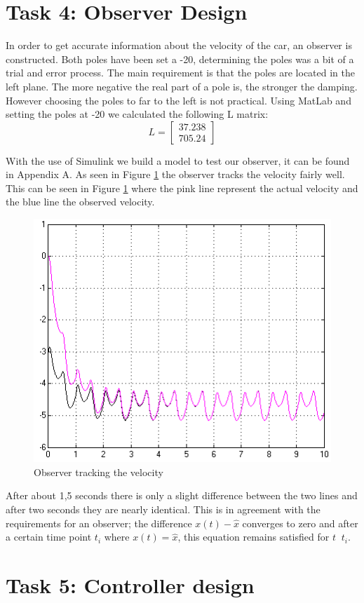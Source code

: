 \documentclass[final]{scrreprt} %
\begin{document}
\section*{Task 4: Observer Design}
In order to get accurate information about the velocity of the car, an observer is constructed. Both poles have been set a -20, determining the poles was a bit of a trial and error process. The main requirement is that the poles are located in the left plane. The more negative the real part of a pole is, the stronger the damping. However choosing the poles to far to the left is not practical. Using MatLab and setting the poles at -20 we calculated the following L matrix:
\begin{equation}
L=
\begin{bmatrix}
  37.238 \\
  705.24
 \end{bmatrix}
\end{equation}

With the use of Simulink we build a model to test our observer, it can be found in Appendix A.
As seen in Figure \ref{fig:observer} the observer tracks the velocity fairly well. This can be seen in Figure \ref{fig:observer} where the pink line represent the actual velocity and the blue line the observed velocity. 

\begin{figure}[H]
\centering
\includegraphics[width=0.5\linewidth]{res/observer-res.png}
\caption{Observer tracking the velocity}
\label{fig:observer}
\end{figure}

After about 1,5 seconds there is only a slight difference between the two lines and after two seconds they are nearly identical. This is in agreement with the requirements for an observer; the difference $x(t)-\hat{x}$ converges to zero and after a certain time point $t_i$ where $x(t) = \hat{x}$, this equation remains satisfied for $t$ \geq $~t_i$.

\section*{Task 5: Controller design}
\end{document}
